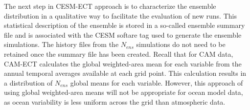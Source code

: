 \documentclass[gmd, manuscript]{copernicus}
\begin{document}


The next step in CESM-ECT approach is to characterize the ensemble distribution in a qualitative way to facilitate the evaluation of new runs.  This statistical description of the ensemble is stored in a so-called ensemble summary file and is associated with the CESM softare tag used to generate the ensemble simulations.  The history files from the $N_{ens}$ simulations do not need to be retained once the summary file has been created.  Recall that for CAM data, CAM-ECT calculates the global weighted-area mean for each variable from the annual temporal averages available at each grid point.  This calculation results in a distribution of $N_{ens}$ global means for each variable. However, this approach of using global weighted-area means will not be appropriate for ocean model data, as ocean variability is less uniform across the grid than atmospheric data.
\end{document}
